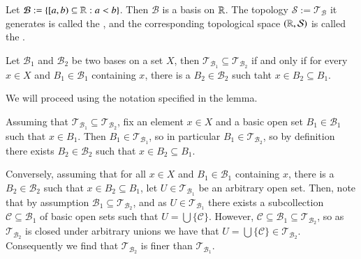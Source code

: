 \documentclass[12pt, a4paper, twoside, openright, titlepage]{book}
\begin{document}
\begin{defn}{}{}
    Let $\mathcal{B} := \{[a,b)\subseteq\mathbb R:a <b\}$. Then $\mathcal{B}$ is a basis on $\mathbb R$. The topology $\mathcal{S} := \mathcal{T}_{\mathcal{B}}$ it generates is called the , and the corresponding topological space $(\mathbb R,\mathcal{S})$ is called the . 
\end{defn}

\begin{lem}{}{}
    Let $\mathcal{B}_1$ and $\mathcal{B}_2$ be two bases on a set $X$, then $\mathcal{T}_{\mathcal{B}_1} \subseteq \mathcal{T}_{\mathcal{B}_2}$ if and only if for every $x \in X$ and $B_1 \in \mathcal{B}_1$ containing $x$, there is a $B_2 \in \mathcal{B}_2$ such taht $x \in B_2 \subseteq B_1$.
\end{lem}
\begin{proof*}{}{}
    We will proceed using the notation specified in the lemma.

    Assuming that $\mathcal{T}_{\mathcal{B}_1}\subseteq \mathcal{T}_{\mathcal{B}_2}$, fix an element $x \in X$ and a basic open set $B_1 \in \mathcal{B}_1$ such that $x \in B_1$. Then $B_1 \in \mathcal{T}_{\mathcal{B}_1}$, so in particular $B_1 \in \mathcal{T}_{\mathcal{B}_2}$, so by definition there exists $B_2 \in \mathcal{B}_2$ such that $x \in B_2 \subseteq B_1$.


    Conversely, assuming that for all $x \in X$ and $B_1 \in \mathcal{B}_1$ containing $x$, there is a $B_2 \in \mathcal{B}_2$ such that $x \in B_2 \subseteq B_1$, let $U \in \mathcal{T}_{\mathcal{B}_1}$ be an arbitrary open set. Then, note that by assumption $\mathcal{B}_1 \subseteq \mathcal{T}_{\mathcal{B}_2}$, and as $U \in \mathcal{T}_{\mathcal{B}_1}$ there exists a subcollection $\mathcal{C} \subseteq \mathcal{B}_1$ of basic open sets such that $U = \bigcup\{\mathcal{C}\}$. However, $\mathcal{C} \subseteq \mathcal{B}_1\subseteq\mathcal{T}_{\mathcal{B}_2}$, so as $\mathcal{T}_{\mathcal{B}_2}$ is closed under arbitrary unions we have that $U =\bigcup\{\mathcal{C}\} \in \mathcal{T}_{\mathcal{B}_2}$. Consequently we find that $\mathcal{T}_{\mathcal{B}_2}$ is finer than $\mathcal{T}_{\mathcal{B}_1}$.
\end{proof*}
\end{document}
